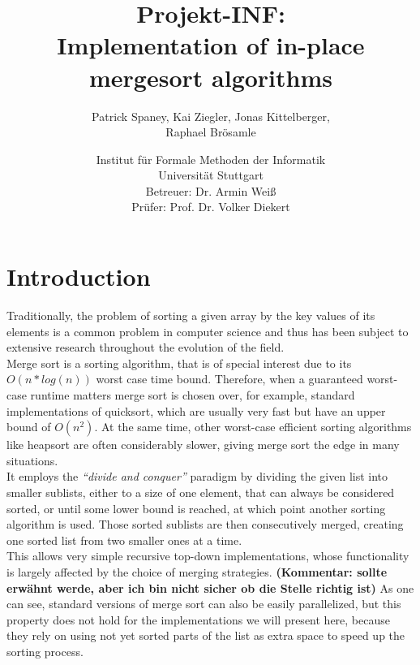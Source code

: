 \documentclass[11pt,pdftex,a4paper, twocolumn]{article}
\begin{document}
\title{Projekt-INF:\\
Implementation of in-place mergesort algorithms}
\author{Patrick Spaney, Kai Ziegler, Jonas Kittelberger, \\ Raphael Brösamle}
\date{Institut für Formale Methoden der Informatik \\ Universität Stuttgart\\
\normalsize Betreuer: Dr. Armin Weiß\\
Prüfer: Prof. Dr. Volker Diekert}
\maketitle
\section*{Introduction}
Traditionally, the problem of sorting a given array by the key values of its elements is a common problem in computer science and thus has been subject to extensive research throughout the evolution of the field. \\
Merge sort is a sorting algorithm, that is of special interest due to its $O(n*log(n))$ worst case time bound. Therefore, when a guaranteed worst-case runtime matters merge sort is chosen over, for example, standard implementations of quicksort, which are usually very fast but have an upper bound of $O(n^{2})$. At the same time, other worst-case efficient sorting algorithms like heapsort are often considerably slower, giving merge sort the edge in many situations. \\
It employs the \textit{“divide and conquer”} paradigm by dividing the given list into smaller sublists, either to a size of one element, that can always be considered sorted, or until some lower bound is reached, at which point another sorting algorithm is used. Those sorted sublists are then consecutively merged, creating one sorted list from two smaller ones at a time. \\
This allows very simple recursive top-down implementations, whose functionality is largely affected by the choice of merging strategies.
\textbf{(Kommentar: sollte erwähnt werde, aber ich bin nicht sicher ob die Stelle richtig ist)} As one can see, standard versions of merge sort can also be easily parallelized, but this property does not hold for the implementations we will present here, because they rely on using not yet sorted parts of the list as extra space to speed up the sorting process. \\
\end{document}
